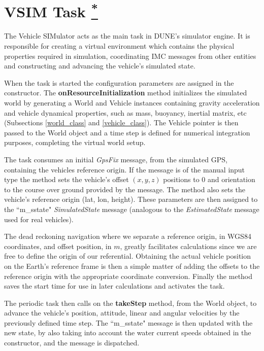 \documentclass[10pt,a4paper]{article}
\begin{document}
\section{VSIM Task \href{https://www.lsts.pt/docs/dune/dune-2017.01.0-dmsmw/d2/d2f/structSimulators_1_1VSIM_1_1Task.html}{\textsuperscript{*}}}

The Vehicle SIMulator acts as the main task in DUNE's simulator engine. It is responsible for creating a virtual environment which contains the physical properties required in simulation, coordinating IMC messages from other entities and constructing and advancing the vehicle's simulated state.

\par When the task is started the configuration parameters are assigned in the constructor. The \textbf{onResourceInitialization} method initializes the simulated world by generating a World and Vehicle instances containing gravity acceleration and vehicle dynamical properties, such as mass, buoyancy, inertial matrix, etc (Subsections \ref{world_class} and \ref{vehicle_class}). The Vehicle pointer is then passed to the World object and a time step is defined for numerical integration purposes, completing the virtual world setup.

\par The task consumes an initial \textit{GpsFix} message, from the simulated GPS, containing the vehicles reference origin. If the message is of the manual input type the method sets the vehicle's offset $\left(x,y,z\right)$ positions to 0 and orientation to the course over ground provided by the message. The method also sets the vehicle's reference origin (lat, lon, height). These parameters are then assigned to the ``m\_sstate" \textit{SimulatedState} message (analogous to the \textit{EstimatedState} message used for real vehicles).

\par The dead reckoning navigation where we separate a reference origin, in WGS84 coordinates, and offset position, in $m$, greatly facilitates calculations since we are free to define the origin of our referential. Obtaining the actual vehicle position on the Earth's reference frame is then a simple matter of adding the offsets to the reference origin with the appropriate coordinate conversion. Finally the method saves the start time for use in later calculations and activates the task.

\par The periodic task then calls on the \textbf{takeStep} method, from the World object, to advance the vehicle's position, attitude, linear and angular velocities by the previously defined time step. The ``m\_sstate" message is then updated with the new state, by also taking into account the water current speeds obtained in the constructor, and the message is dispatched.
\end{document}
